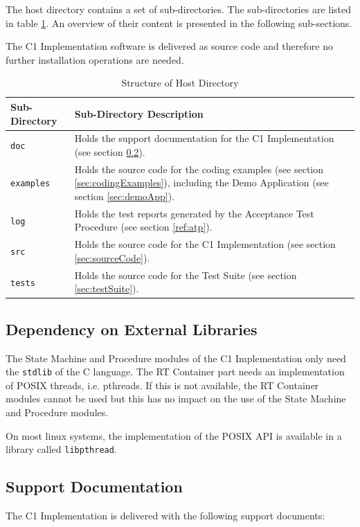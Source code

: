 \documentclass[manual]{../fwprofile}
\begin{document}
The host directory contains a set of sub-directories. The sub-directories are listed in table \ref{tab:hostdir}. An overview of their content is presented in the following sub-sections. 

The C1 Implementation software is delivered as source code and therefore no further installation operations are needed.

\begin{longtable}{|l|p{8.7cm}|}
\caption{Structure of Host Directory}\label{tab:hostdir} \\
\hline
\rowcolor{gray}
\textbf{Sub-Directory} & \textbf{Sub-Directory Description}\\
\hline\hline
\texttt{doc} & Holds the support documentation for the C1 Implementation (see section \ref{sec:supportDoc}).\\
\hline
\texttt{examples} & Holds the source code for the coding examples (see section \ref{sec:codingExamples}), including the Demo Application (see section \ref{sec:demoApp}).\\
\hline
\texttt{log} & Holds the test reports generated by the Acceptance Test Procedure (see section \ref{ref:atp}).\\
\hline
\texttt{src} & Holds the source code for the C1 Implementation (see section \ref{sec:sourceCode}).\\
\hline
\texttt{tests} & Holds the source code for the Test Suite (see section \ref{sec:testSuite}).\\
\hline
\end{longtable}

\subsection{Dependency on External Libraries}\label{sec:DepExtLib}
The State Machine and Procedure modules of the C1 Implementation only need the \texttt{stdlib} of the C language. The RT Container part needs an implementation of POSIX threads, i.e. pthreads. If this is not available, the RT Container modules cannot be used but this has no impact on the use of the State Machine and Procedure modules.

On most linux systems, the implementation of the POSIX API is available in a library called \texttt{libpthread}. 

\subsection{Support Documentation}\label{sec:supportDoc}
The C1 Implementation is delivered with the following support documents: 
\end{document}
